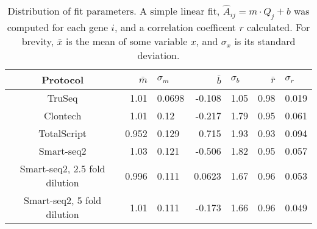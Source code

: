 
\begin{table}[htdp]

\caption{Distribution of fit parameters. A simple linear fit,
             $\hat{A}_{ij} = m \cdot Q_{j} + b$
             was computed for each gene $i$, and a correlation coefficent $r$
             calculated.  For brevity,
             $\bar{x}$ is the mean of some variable $x$, and $\sigma_x$ is its
             standard deviation.  }
             \begin{center}
             \begin{tabular}{|c|r@{$\pm$}l|r@{$\pm$}l|r@{$\pm$}l|}
             \hline Protocol & $\bar{m}$ & $\sigma_m$ & $\bar{b}$ & $\sigma_b$
                    & $\bar{r}$ & $\sigma_r$ \\\hline
TruSeq & 1.01 & 0.0698 & -0.108 & 1.05 & 0.98 & 0.019 \\
Clontech & 1.01 & 0.12 & -0.217 & 1.79 & 0.95 & 0.061 \\
TotalScript & 0.952 & 0.129 & 0.715 & 1.93 & 0.93 & 0.094 \\
Smart-seq2 & 1.03 & 0.121 & -0.506 & 1.82 & 0.95 & 0.057 \\
Smart-seq2, 2.5 fold dilution & 0.996 & 0.111 & 0.0623 & 1.67 & 0.96 & 0.053 \\
Smart-seq2, 5 fold dilution & 1.01 & 0.111 & -0.173 & 1.66 & 0.96 & 0.049 \\\hline
\end{tabular}
\label{tab:fits}
\end{center}
\end{table}



              